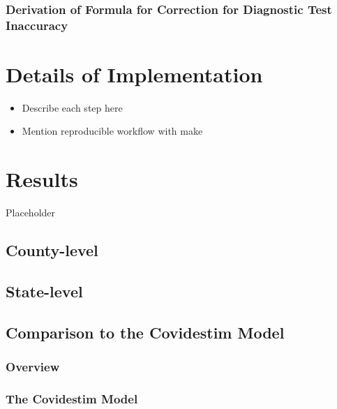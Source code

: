 \documentclass[12pt,twoside]{smiththesis}
\providecommand{\tightlist}{%
  \setlength{\itemsep}{0pt}\setlength{\parskip}{0pt}}
\begin{document}
\hypertarget{derivation-of-formula-for-correction-for-diagnostic-test-inaccuracy}{%
\subsection{Derivation of Formula for Correction for Diagnostic Test Inaccuracy}\label{derivation-of-formula-for-correction-for-diagnostic-test-inaccuracy}}

\hypertarget{details-of-implementation}{%
\chapter{Details of Implementation}\label{details-of-implementation}}
\begin{itemize}
\tightlist
\item
  Describe each step here
\item
  Mention reproducible workflow with make
\end{itemize}
\hypertarget{results}{%
\chapter{Results}\label{results}}

Placeholder

\hypertarget{county-level}{%
\section{County-level}\label{county-level}}

\hypertarget{state-level}{%
\section{State-level}\label{state-level}}

\hypertarget{comparison-to-the-covidestim-model}{%
\section{Comparison to the Covidestim Model}\label{comparison-to-the-covidestim-model}}

\hypertarget{overview}{%
\subsection{Overview}\label{overview}}

\hypertarget{the-covidestim-model}{%
\subsection{The Covidestim Model}\label{the-covidestim-model}}
\end{document}
